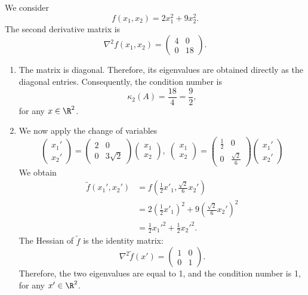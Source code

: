 
We consider
\[
f(x_1,x_2)=2x_1^2+9x_2^2.
\]
The second derivative matrix is
\[
   \nabla^2 f(x_1,x_2)
=
\begin{pmatrix}
    4  & 0 \\
    0 & 18
\end{pmatrix}.
\]
\begin{enumerate}
\item The matrix is diagonal. Therefore, its eigenvalues are obtained
directly as the diagonal entries. Consequently, the condition number
is
\[
\kappa_2(A) = \frac{18}{4} = \frac{9}{2},
\]
for any $x\in \R^2$.
\item We now apply the change of variables
\[
   \begin{pmatrix}
    x_1' \\
    x_2'
\end{pmatrix}
=
\begin{pmatrix}
    2  & 0 \\
    0 & 3 \sqrt{2}
\end{pmatrix}
\begin{pmatrix}
    x_1 \\
    x_2
\end{pmatrix},
\;
   \begin{pmatrix}
    x_1 \\
    x_2
\end{pmatrix}
=
\begin{pmatrix}
    \frac{1}{2}  & 0 \\
    0 & \frac{\sqrt{2}}{6}
\end{pmatrix}
\begin{pmatrix}
    x_1' \\
    x_2'
\end{pmatrix}
\]
We obtain
\begin{align*}
  \tilde{f}(x_1',x_2')&= f(\frac{1}{2} x'_1,\frac{\sqrt{2}}{6} x_2') \\
       &= 2 (\frac{1}{2} x'_1)^2 + 9 (\frac{\sqrt{2}}{6} x_2')^2 \\
    &= \frac{1}{2}x_1'^2+\frac{1}{2}x_2'^2.
\end{align*}
The Hessian of $\tilde{f}$ is the identity matrix:
\[
\nabla^2 \tilde{f}(x') = \begin{pmatrix}
  1 & 0 \\ 0 & 1
\end{pmatrix}.
\]
Therefore, the two eigenvalues are equal to 1, and the condition number
is 1, for any $x'\in\R^2$. 
\end{enumerate}


